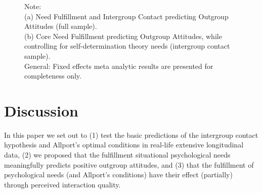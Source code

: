 \documentclass[man, 12pt, a4paper]{apa7}
\theoremstyle{break}
\theoremstyle{plain}
\begin{document}
\begin{figure}
\begin{subfigure}{\textwidth}
  \end{subfigure}
  \caption*{Note: \\
  (a) Need Fulfillment and Intergroup Contact predicting Outgroup Attitudes (full sample).\\
  (b) Core Need Fulfillment predicting Outgroup Attitudes, while controlling for self-determination theory needs (intergroup contact sample).\\
  General: Fixed effects meta analytic results are presented for completeness only.}
\end{figure}


\section{Discussion}
In this paper we set out to (1) test the basic predictions of the intergroup contact hypothesis and Allport's optimal conditions in real-life extensive longitudinal data, (2) we proposed that the fulfillment situational psychological needs meaningfully predicts positive outgroup attitudes, and (3) that the fulfillment of psychological needs (and Allport's conditions) have their effect (partially) through perceived interaction quality. 
\end{document}
